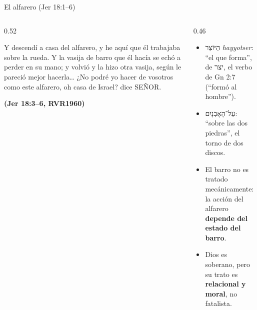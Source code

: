 \documentclass[hyperref={bookmarks=false},aspectratio=169]{beamer}
\newcommand{\heb}[1]{\mbox{\foreignlanguage{hebrew}{#1}}}
\newcommand{\SENOR}{S{\fontsize{0.78em}{1em}\selectfont EÑOR}}
\newcommand{\fuente}[1]{\par\hfill{\upshape\bfseries\footnotesize\textcolor{azul}{#1}}}
\newcommand{\destacar}[1]{\textbf{\textcolor{azul}{#1}}}
\begin{document}
\begin{frame}{El alfarero (Jer 18:1--6)}
\begin{columns}[t,onlytextwidth]
\begin{column}{0.52\textwidth}
\begin{cita}Y descendí a casa del alfarero, y he aquí que él trabajaba sobre la rueda. Y la vasija de barro que él hacía se echó a perder en su mano; y volvió y la hizo otra vasija, según le pareció mejor hacerla\ldots{} ¿No podré yo hacer de vosotros como este alfarero, oh casa de Israel? dice \SENOR.\fuente{(Jer 18:3--6, RVR1960)}\end{cita}
\end{column}
\begin{column}{0.46\textwidth}\small
\begin{itemize}
\item \heb{הַיּוֹצֵר} \emph{hayyotser}: ``el que forma'', de \heb{יצר}, el verbo de Gn 2:7 (``formó al hombre'').
\item \heb{עַל־הָאָבְנָיִם}: ``sobre las dos piedras'', el torno de dos discos.
\item El barro no es tratado mecánicamente: la acción del alfarero \destacar{depende del estado del barro}.
\item Dios es soberano, pero su trato es \destacar{relacional y moral}, no fatalista.
\end{itemize}
\end{column}
\end{columns}
\end{frame}
\end{document}
